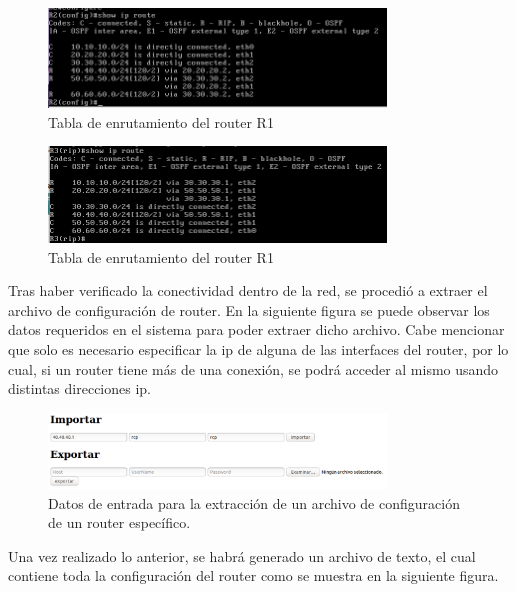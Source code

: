 \pagebreak
\begin{figure}[htbp!]
	\centering
		\includegraphics[width=0.8\textwidth]{desarrollo/tarea3/imagenes/imagen5.png}
	\caption{Tabla de enrutamiento del router R1}
\end{figure}

\begin{figure}[htbp!]
	\centering
		\includegraphics[width=0.8\textwidth]{desarrollo/tarea3/imagenes/imagen6.png}
	\caption{Tabla de enrutamiento del router R1}
\end{figure}

Tras haber verificado la conectividad dentro de la red, se procedió a extraer el archivo de configuración de router. En la siguiente figura se puede observar los datos requeridos en el sistema para poder extraer dicho archivo. Cabe mencionar que solo es necesario especificar la ip de alguna de las interfaces del router, por lo cual, si un router tiene más de una conexión, se podrá acceder al mismo usando distintas direcciones ip.

\begin{figure}[htbp!]
	\centering
		\includegraphics[width=0.8\textwidth]{desarrollo/tarea3/imagenes/imagen7.png}
	\caption{Datos de entrada para la extracción de un archivo de configuración de un router específico.}
\end{figure}

\pagebreak
Una vez realizado lo anterior, se habrá generado un archivo de texto, el cual contiene toda la configuración del router como se muestra en la siguiente figura.

